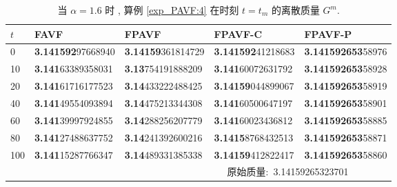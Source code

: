 \begin{table}[H]\footnotesize
	\centering
	\caption{当 $\alpha=1.6$ 时 , 算例 \ref{exp_PAVF:4}  在时刻 $t=t_{m}$ 的离散质量 $G^{m}$.}
	
	\begin{tabular}{p{0.7cm}p{3cm}p{3cm}p{3cm}p{3cm}}
	  \toprule
$t$   &FAVF   &FPAVF   &FPAVF-C   &FPAVF-P\\
	\midrule
	0     & \textbf{3.141592}97668940 & \textbf{3.14159}361814729 & \textbf{3.141592}41218683 & \textbf{3.141592653}58976 \\
	10    & \textbf{3.141}63389358031 & \textbf{3.13}754191888209 & \textbf{3.141}60072631792 & \textbf{3.141592653}58928 \\
	20    & \textbf{3.141}61716177523 & \textbf{3.14}433222488425 & \textbf{3.14159}044899067 & \textbf{3.141592653}58919 \\
	40    & \textbf{3.141}49554093894 & \textbf{3.14}475213344308 & \textbf{3.141}60500647197 & \textbf{3.141592653}58901 \\
	60    & \textbf{3.141}39997924855 & \textbf{3.14}288256207779 & \textbf{3.141}60023436812 & \textbf{3.141592653}58885 \\
	80    & \textbf{3.141}27488637752 & \textbf{3.14}241392600216 & \textbf{3.1415}8768432513 & \textbf{3.141592653}58871 \\
	100   & \textbf{3.141}15287766347 & \textbf{3.14}489331385338 & \textbf{3.14159}412822417 & \textbf{3.141592653}58860 \\
	  \midrule
	  \multicolumn{5}{r}{原始质量:~3.14159265323701~~~~~~~~} \\
	  \bottomrule
	  \end{tabular}\label{tab_PAVF:4-3}%
  \end{table}%

